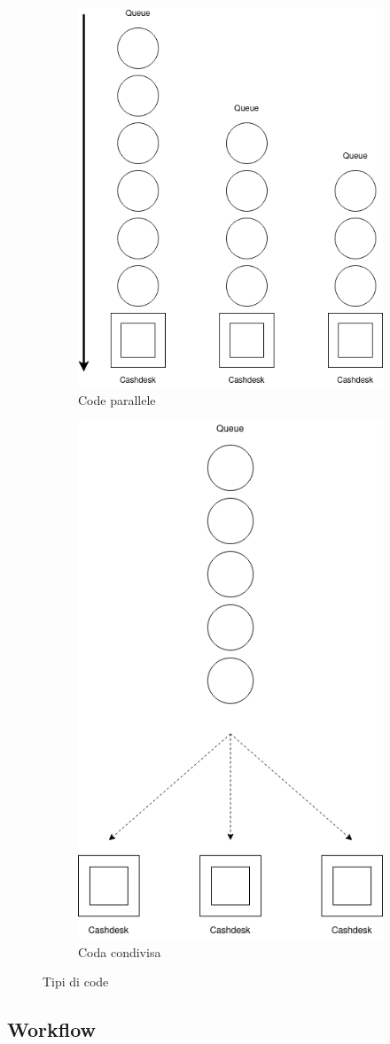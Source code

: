\begin{figure}
\centering
\begin{subfigure}{.5\textwidth}
  \centering
  \includegraphics[width=.4\linewidth]{"doc/images/parallel-queues.png"}
  \caption{Code parallele}
  \label{fig:sub1}
\end{subfigure}%
\begin{subfigure}{.5\textwidth}
  \centering
  \includegraphics[width=.4\linewidth]{"doc/images/n-fork.png"}
  \caption{Coda condivisa}
  \label{fig:sub2}
\end{subfigure}
\caption{Tipi di code}
\label{fig:test}
\end{figure}


\subsection{Workflow}

